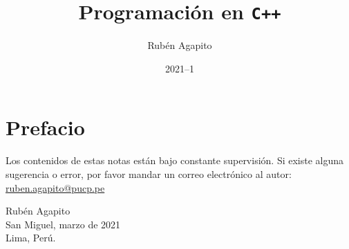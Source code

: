 \documentclass[11pt]{book}
\title{Programación en \texttt{C++}}
\author{Rubén Agapito}
\date{2021--1}
\theoremstyle{plain} %
\theoremstyle{plain}
\theoremstyle{plain}
\theoremstyle{plain} %
\theoremstyle{plain} %
\theoremstyle{plain} %
\theoremstyle{nonumberplain} %
\theoremstyle{nonumberplain} %
\begin{document}
\frontmatter %
\thispagestyle{empty}
\maketitle %
\clearpage{}
\tableofcontents
\cleardoublepage
{}
{}%
\lstlistoflistings

\cleardoublepage
{}
{}
\chapter*{Prefacio}

Los contenidos de estas notas están bajo constante supervisión. Si existe
alguna sugerencia o error, por favor mandar un correo electrónico al autor:
\href{mailto:ruben.agapito@pucp.pe}{ruben.agapito@pucp.pe}

\vspace{1cm}
\begin{flushleft}
	Rubén Agapito \\
	San Miguel, marzo de 2021 \\
	Lima, Perú.
\end{flushleft}

\mainmatter
\clearpage{}
% 


% 
% 
% 
% 
\backmatter

\end{document}
